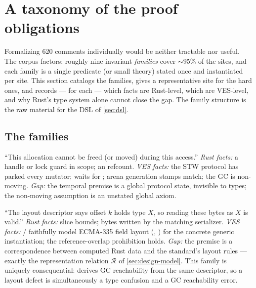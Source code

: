 \section{A taxonomy of the proof obligations}
\label{sec:obligations}

Formalizing 620 comments individually would be neither tractable nor
useful. The corpus factors: roughly nine invariant \emph{families}
cover $\sim$95\% of the sites, and each family is a single predicate (or
small theory) stated once and instantiated per site. This section
catalogs the families, gives a representative site for the hard ones,
and records --- for each --- which facts are Rust-level, which are
VES-level, and why Rust's type system alone cannot close the gap. The
family structure is the raw material for the DSL of \cref{sec:dsl}.

\subsection{The families}

\begin{obligationbox}
``This allocation cannot be freed (or moved) during this access.''
\emph{Rust facts:} a  handle or lock guard in scope; an
 refcount. \emph{VES facts:} the STW protocol has parked every
mutator;  waits for ;
arena generation stamps match; the GC is non-moving. \emph{Gap:} the
temporal premise is a global protocol state, invisible to types; the
non-moving assumption is an unstated global axiom.
\end{obligationbox}

\begin{obligationbox}
``The layout descriptor says offset $k$ holds type $X$, so reading these
bytes as $X$ is valid.'' \emph{Rust facts:} slice bounds; bytes written
by the matching serializer. \emph{VES facts:}
/ faithfully model ECMA-335 field
layout (, ) for the concrete generic
instantiation; the reference-overlap prohibition holds. \emph{Gap:} the
premise is a correspondence between computed Rust data and the
standard's layout rules --- exactly the representation relation
$\mathcal{R}$ of \cref{sec:design-model}. This family is uniquely
consequential:  derives GC reachability
from the same descriptor, so a layout defect is simultaneously a type
confusion and a GC reachability error.
\end{obligationbox}

